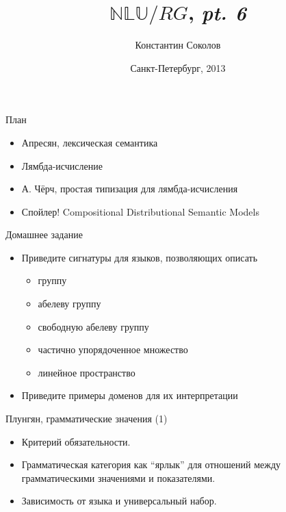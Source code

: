 \documentclass{beamer}
\begin{document}
\title{\huge{$\mathbb{NLU}/RG$, \textit{pt. 6}}}
\author{Константин Соколов}
\date{Санкт-Петербург, 2013} 
\begin{frame}
    \thispagestyle{empty}
    \titlepage
\end{frame}

\begin{frame}{План}
    \setcounter{framenumber}{1}
    \begin{itemize}
        \item Апресян, лексическая семантика
        \item Лямбда-исчисление
        \item А. Чёрч, простая типизация для лямбда-исчисления
        \item Спойлер! Compositional Distributional Semantic Models
    \end{itemize}
\end{frame}

\begin{frame}{Домашнее задание}
\begin{itemize}
  \item Приведите сигнатуры для языков, позволяющих описать
    \begin{itemize}
      \item группу
      \item абелеву группу
      \item свободную абелеву группу
      \item частично упорядоченное множество
      \item линейное пространство
    \end{itemize}
  \item Приведите примеры доменов для их интерпретации
\end{itemize}
\end{frame}

\begin{frame}{Плунгян, грамматические значения (1)}
\begin{itemize}
  \item Критерий обязательности.
  \item Грамматическая категория как ``ярлык'' для отношений между грамматическими значениями и показателями.
  \item Зависимость от языка и универсальный набор.
\end{itemize}
\end{frame}
\end{document}

